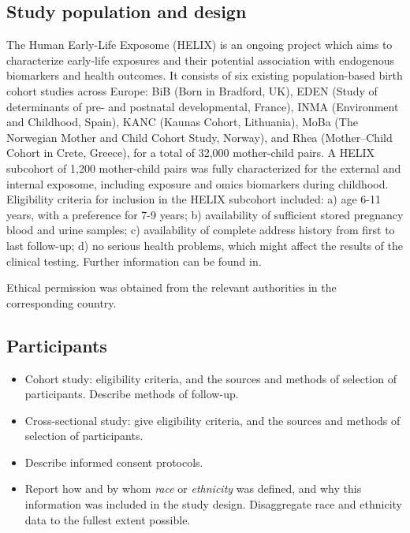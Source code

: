 \documentclass[
  letterpaper,
  DIV=11,
  numbers=noendperiod]{scrartcl}
\providecommand{\tightlist}{%
  \setlength{\itemsep}{0pt}\setlength{\parskip}{0pt}}\usepackage{longtable,booktabs,array}
\begin{document}
\subsection{Study population and design}\label{sec-design}

The Human Early-Life Exposome (HELIX) is an ongoing project which aims
to characterize early-life exposures and their potential association
with endogenous biomarkers and health
outcomes\textsuperscript{}.
It consists of six existing population-based birth cohort studies across
Europe: BiB (Born in Bradford,
UK)\textsuperscript{}, EDEN
(Study of determinants of pre- and postnatal developmental,
France)\textsuperscript{}, INMA
(Environment and Childhood,
Spain)\textsuperscript{},
KANC (Kaunas Cohort,
Lithuania)\textsuperscript{},
MoBa (The Norwegian Mother and Child Cohort Study,
Norway)\textsuperscript{}, and
Rhea (Mother--Child Cohort in Crete,
Greece)\textsuperscript{}, for a
total of 32,000 mother-child pairs. A HELIX subcohort of 1,200
mother-child pairs was fully characterized for the external and internal
exposome, including exposure and omics biomarkers during childhood.
Eligibility criteria for inclusion in the HELIX subcohort included: a)
age 6-11 years, with a preference for 7-9 years; b) availability of
sufficient stored pregnancy blood and urine samples; c) availability of
complete address history from first to last follow-up; d) no serious
health problems, which might affect the results of the clinical testing.
Further information can be found
in\textsuperscript{}.

Ethical permission was obtained from the relevant authorities in the
corresponding country.

\subsection{Participants}\label{sec-participants}

\begin{itemize}
\tightlist
\item
  Cohort study: eligibility criteria, and the sources and methods of
  selection of participants. Describe methods of follow-up.
\item
  Cross-sectional study: give eligibility criteria, and the sources and
  methods of selection of participants.
\item
  Describe informed consent protocols.
\item
  Report how and by whom \emph{race} or \emph{ethnicity} was defined,
  and why this information was included in the study design.
  Disaggregate race and ethnicity data to the fullest extent possible.
\end{itemize}
\end{document}

